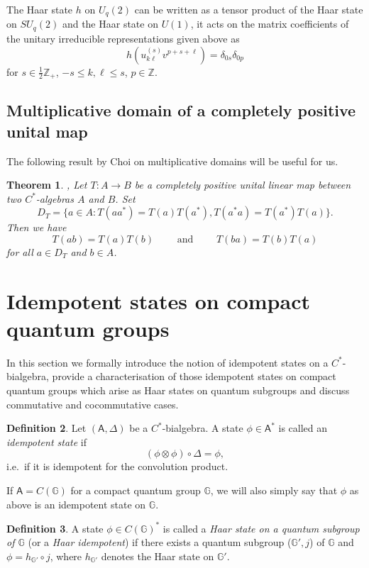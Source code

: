 \documentclass[12pt]{amsart}
\newtheorem{theorem}{Theorem}[section]
\theoremstyle{definition}
\newtheorem{definition}[theorem]{Definition}
\theoremstyle{remark}
\numberwithin{equation}{section}
\begin{document}
The Haar state $h$ on $U_q(2)$ can be written as a tensor product of the Haar state on $SU_q(2)$ and the Haar 
state on $U(1)$, it acts on the matrix coefficients of the unitary irreducible representations given above as
\[
h\left(u^{(s)}_{k\ell}v^{p+s+\ell}\right) = \delta_{0s}\delta_{0p}
\]
for $s\in\frac{1}{2}\mathbb{Z}_+$, $-s\le k,\ell\le s$, $p\in\mathbb{Z}$.

\subsection{Multiplicative domain of a completely positive unital map}
The following result by Choi on multiplicative domains will be useful for us.
\begin{theorem}\label{mult-dom}\cite[Theorem 3.1]{choi74}, \cite[Theorem 3.18]{paulsen02}
Let $T:A\to B$ be a completely positive unital linear map between two $C^*$-algebras $A$ and $B$.
Set
\[
D_T=\{a\in A: T(aa^*)=T(a)T(a^*), T(a^*a)=T(a^*)T(a)\}.
\]
Then we have
\[
T(ab)=T(a)T(b) \qquad\mbox{ and }\qquad T(ba)=T(b)T(a)
\]
for all $a\in D_T$ and $b\in A$.
\end{theorem}

\section{Idempotent states on compact quantum groups}

In this section we formally introduce the notion of idempotent states on a $C^*$-bialgebra, provide a characterisation of those
idempotent states on compact quantum groups which arise as Haar states on quantum subgroups and discuss commutative and
cocommutative cases.

\begin{definition} Let $(\mathsf{A},\Delta)$ be a $C^*$-bialgebra. A state
  $\phi\in \mathsf{A}^*$ is called an {\em idempotent state} if
\[
(\phi \otimes \phi) \circ\Delta = \phi,
\]
i.e.\ if it is idempotent for the convolution product. \label{defidemp}
\end{definition}

If $\mathsf{A}=C({\mathbb{G}})$ for a compact quantum group ${\mathbb{G}}$, we will also simply say that $\phi$ as above is an idempotent state on ${\mathbb{G}}$.

\begin{definition} \label{defHaaridemp}
A state $\phi\in C({\mathbb{G}})^*$ is called a {\em Haar state on a quantum subgroup of
${\mathbb{G}}$} (or a {\em Haar idempotent}) if there exists a quantum subgroup
(${\mathbb{G}}',j$) of ${\mathbb{G}}$ and $\phi = h_{{\mathbb{G}}'} \circ j$, where  $h_{{\mathbb{G}}'}$ denotes the Haar state on ${\mathbb{G}}'$.
\end{definition}
\end{document}
